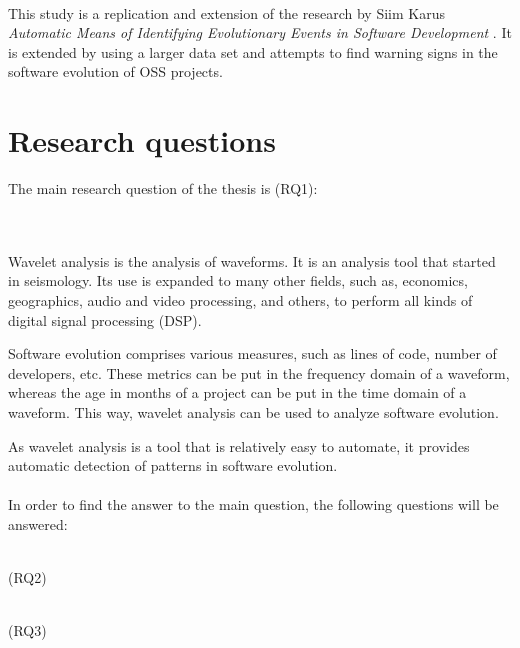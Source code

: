 \paragraph{}
This study is a replication and extension of the research by Siim Karus
\emph{Automatic Means of Identifying Evolutionary Events in Software
Development} \cite{karus2013}. It is extended by using a larger data set and
attempts to find warning signs in the software evolution of OSS projects.

\section{Research questions}
\label{questions}

The main research question of the thesis is (RQ1):
\begin{description}
	\item \hfill \\ \emph{\researchQuestion}
\end{description}

\paragraph{}
Wavelet analysis is the analysis of waveforms. It is an analysis tool that
started in seismology. Its use is expanded to many other fields, such as,
economics, geographics, audio and video processing, and others, to perform
all kinds of digital signal processing (DSP).

Software evolution comprises various measures, such as lines of code, number of
developers, etc. These metrics can be put in the frequency domain of a waveform,
whereas the age in months of a project can be put in the time domain of a
waveform. This way, wavelet analysis can be used to analyze software evolution.

As wavelet analysis is a tool that is relatively easy to automate, it
provides automatic detection of patterns in software evolution.

\paragraph{}
In order to find the answer to the main question, the following questions will
be answered:
\begin{description}
	\item \hfill \\ \emph{\subQuestionOne} (RQ2)
	\item \hfill \\ \emph{\subQuestionTwo} (RQ3)
\end{description}

